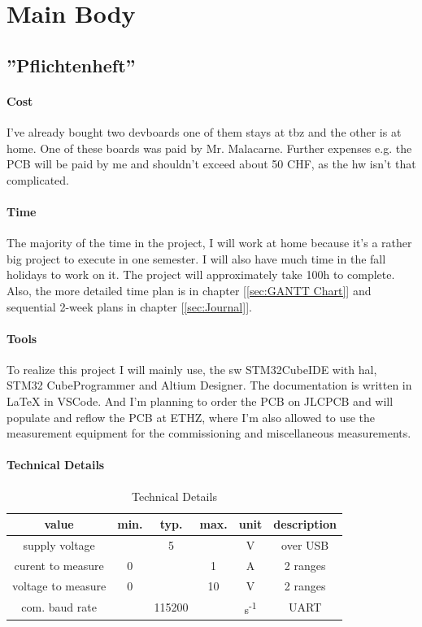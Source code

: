 \chapter{Main Body}
\label{cha:Main Body}


\section{''Pflichtenheft''}
\label{sec:Pflichtenheft}

\subsubsection{Cost}
I've already bought two \acs{devboard}s one of them stays at \acs{tbz} and the other is at home. One of these boards was paid by Mr. Malacarne. Further expenses e.g. the PCB will be paid by me and shouldn't exceed about 50 CHF, as the \acs{hw} isn't that complicated.

\subsubsection{Time}
The majority of the time in the project, I will work at home because it's a rather big project to execute in one semester. I will also have much time in the fall holidays to work on it. The project will approximately take 100h to complete. Also, the more detailed time plan is in chapter [\ref{sec:GANTT Chart}] and sequential 2-week plans in chapter [\ref{sec:Journal}].

\subsubsection{Tools}
To realize this project I will mainly use, the \acs{sw} STM32CubeIDE with \acs{hal}, STM32 CubeProgrammer and Altium Designer. The documentation is written in LaTeX in VSCode. And I'm planning to order the PCB on JLCPCB and will populate and reflow the PCB at ETHZ, where I'm also allowed to use the measurement equipment for the commissioning and miscellaneous measurements.

\subsubsection{Technical Details}
\begin{table}[H]
    \centering
    \label{tab:Technical Details}
\begin{tabular}{||c || c | c | c | c  || c ||} 
 \hline
 value &  min. & typ. & max. & unit & description \\ [0.5ex] 
 \hline\hline
  supply voltage & & 5 & & V & over USB \\ 
 \hline
 curent to measure & 0 & & 1 & A & 2 ranges \\ 
 \hline
 voltage to measure & 0 & & 10 & V & 2 ranges \\ 
 \hline
 com. baud rate & & 115200 & & s\textsuperscript{-1} & UART \\
 \hline
\end{tabular}
    \caption{Technical Details}
\end{table}

